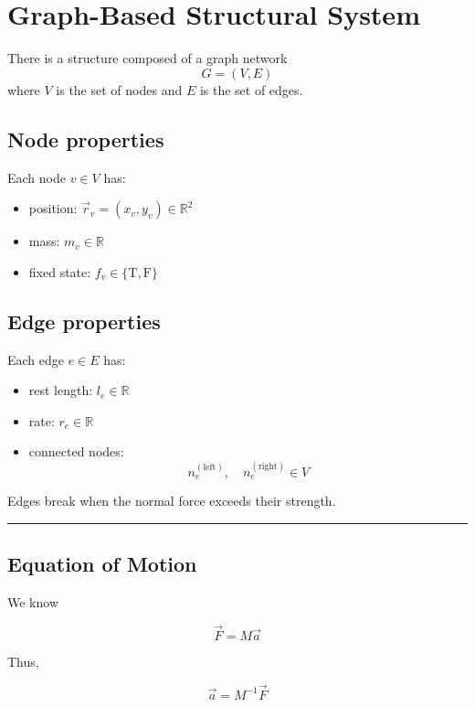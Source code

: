 

\section*{Graph-Based Structural System}

There is a structure composed of a graph network
\[
G = (V, E)
\]
where $V$ is the set of nodes and $E$ is the set of edges.

\subsection*{Node properties}

Each node $v \in V$ has:

\begin{itemize}
\item position: $\vec{r}_v = (x_v, y_v) \in \mathbb{R}^2$
\item mass: $m_v \in \mathbb{R}$
\item fixed state: $f_v \in \{\mathrm{T}, \mathrm{F}\}$
\end{itemize}

\subsection*{Edge properties}

Each edge $e \in E$ has:

\begin{itemize}
\item rest length: $l_e \in \mathbb{R}$
\item rate: $r_e \in \mathbb{R}$
\item connected nodes:
\[
n_e^{(\mathrm{left})}, \quad n_e^{(\mathrm{right})} \in V
\]
\end{itemize}

Edges break when the normal force exceeds their strength.

\vspace{3em}
\hrule
\vspace{2em}

\subsection*{Equation of Motion}

We know

\[
\vec{F} = M \vec{a}
\]

Thus,

\[
\vec{a} = M^{-1} \vec{F}
\tag{1}
\]

